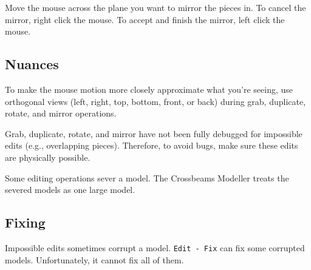 \documentclass[12pt]{report}
\begin{document}
Move the mouse across the plane you want to mirror the pieces in.  To
cancel the mirror, right click the mouse.  To accept and finish the
mirror, left click the mouse.

\subsection{Nuances}

To make the mouse motion more closely approximate what you're seeing,
use orthogonal views (left, right, top, bottom, front, or back) during
grab, duplicate, rotate, and mirror operations.

Grab, duplicate, rotate, and mirror have not been fully debugged for
impossible edits (e.g., overlapping pieces).  Therefore, to avoid
bugs, make sure these edits are physically possible.

Some editing operations sever a model.  The Crossbeams Modeller
treats the severed models as one large model.

\subsection{Fixing}

Impossible edits sometimes corrupt a model.  {\tt Edit - Fix} can fix
some corrupted models.  Unfortunately, it cannot fix all of them.
\end{document}
